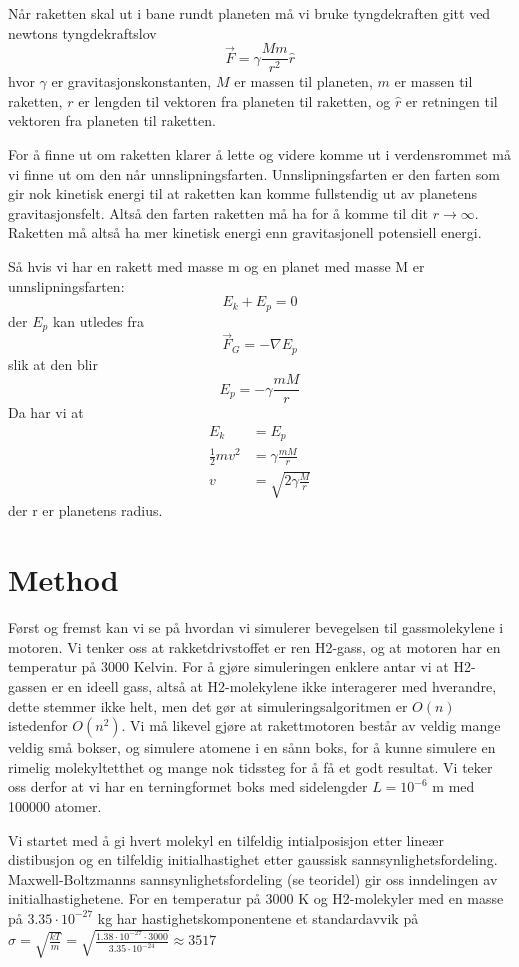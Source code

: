 \documentclass[reprint,english,notitlepage]{revtex4-1}
\begin{document}
	\vspace{0.5cm}

	Når raketten skal ut i bane rundt planeten må vi bruke tyngdekraften gitt ved
	newtons tyngdekraftslov
	$$
		\vec{F} = \gamma\frac{Mm}{r^2}\hat{r}
	$$
	hvor $\gamma$ er gravitasjonskonstanten, $M$ er massen til planeten, $m$ er massen
	til raketten, $r$ er lengden til vektoren fra planeten til raketten, og $\hat{r}$ er
	retningen til vektoren fra planeten til raketten.

	For å finne ut om raketten klarer å lette og videre komme ut i verdensrommet må vi
	finne ut om den når unnslipningsfarten. Unnslipningsfarten er den farten
	som gir nok kinetisk energi til at raketten kan komme fullstendig ut av planetens gravitasjonsfelt.
	Altså den farten raketten må ha for å komme til dit $r\rightarrow\infty$.
	Raketten må altså ha mer kinetisk energi enn gravitasjonell potensiell energi.

	Så hvis vi har en rakett med masse m og en planet med masse M er unnslipningsfarten:
	$$
		E_k + E_p = 0
	$$
	der $E_p$ kan utledes fra
	$$
		\vec{F}_G = -\nabla E_p
  $$
	slik at den blir
	$$
		E_p = -\gamma \frac{mM}{r}
	$$
  Da har vi at
	\begin{align*}
		E_k &= E_p\\
		\frac{1}{2}mv^2 &= \gamma\frac{mM}{r}\\
    v&=\sqrt{2\gamma\frac{M}{r}}
	\end{align*}
	der r er planetens radius.


\section{Method}
	Først og fremst kan vi se på hvordan vi simulerer bevegelsen til gassmolekylene
	i motoren. Vi tenker oss at rakketdrivstoffet er ren H2-gass, og at motoren har
	en temperatur på $3000$ Kelvin. For å gjøre simuleringen enklere antar vi at H2-gassen
	er en ideell gass, altså at H2-molekylene ikke interagerer med hverandre, dette stemmer
	ikke helt, men det gør at simuleringsalgoritmen er $O(n)$ istedenfor $O(n^2)$. Vi
	må likevel gjøre at rakettmotoren består av veldig mange veldig små bokser, og
	simulere atomene i en sånn boks, for å kunne simulere en rimelig molekyltetthet
	og mange nok tidssteg for å få et godt resultat. Vi teker oss derfor at
	vi har en terningformet boks med sidelengder $L = 10^{-6}$ m med 100000 atomer. \

	Vi startet med å gi hvert molekyl en tilfeldig intialposisjon etter
	lineær distibusjon og en tilfeldig initialhastighet etter gaussisk
	sannsynlighetsfordeling. Maxwell-Boltzmanns sannsynlighetsfordeling (se teoridel) gir oss
	inndelingen av initialhastighetene. For en temperatur på $3000$ K og H2-molekyler
	med en masse på $3.35 \cdot 10^{-27}$ kg har hastighetskomponentene et standardavvik
	på $\sigma = \sqrt{\frac{kT}{m}} = \sqrt{\frac{1.38 \cdot 10^{-27} \cdot 3000}{3.35 \cdot 10^{-24}}} \approx 3517$ \
\end{document}
